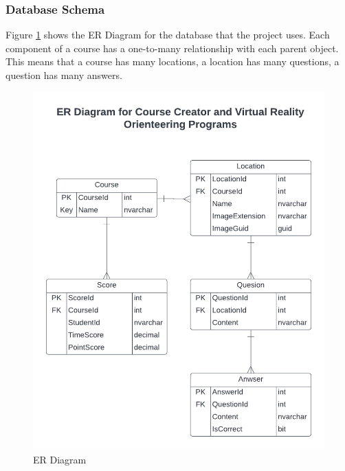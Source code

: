\subsubsection{Database Schema}
Figure \ref{ER Diagram} shows the ER Diagram for the database that the project uses. Each component of a course has a one-to-many relationship with each parent object. This means that a course has many locations, a location has many questions, a question has many answers.
\begin{figure}[htb]
	\centering
	\includegraphics[width=.6\textwidth]{Design/assets/capstone-er-diagram.png}
	\caption[ER Diagram]{\label{ER Diagram}ER Diagram}
\end{figure}
